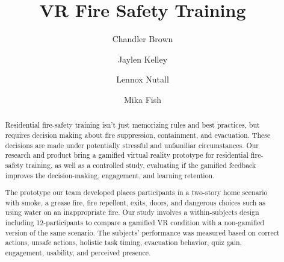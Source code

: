 \documentclass[manuscript, review]{acmart}
\begin{document}
\title{VR Fire Safety Training}

\author{Chandler Brown}

\author{Jaylen Kelley}

\author{Lennox Nutall}

\author{Mika Fish}

\begin{abstract}
  Residential fire-safety training isn’t just memorizing rules and best practices, but requires decision making about fire suppression, containment, and evacuation. These decisions are made under potentially stressful and unfamiliar circumstances. Our research and product bring a gamified virtual reality prototype for residential fire-safety training, as well as a controlled study, evaluating if the gamified feedback improves the decision-making, engagement, and learning retention. 

The prototype our team developed places participants in a two-story home scenario with smoke, a grease fire, fire repellent, exits, doors, and dangerous choices such as using water on an inappropriate fire. Our study involves a within-subjects design including 12-participants to compare a gamified VR condition with a non-gamified version of the same scenario. The subjects’ performance was measured based on correct actions, unsafe actions, holistic task timing, evacuation behavior, quiz gain, engagement, usability, and perceived presence. 
\end{abstract}
\end{document}
